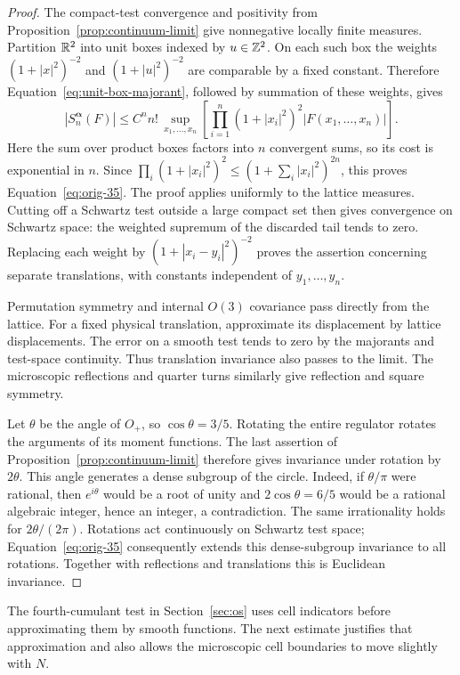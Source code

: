 \begin{proof}
The compact-test convergence and positivity from
Proposition~\ref{prop:continuum-limit} give nonnegative locally finite
measures.  Partition $\mathbb R^2$ into unit boxes indexed by $u\in\mathbb Z^2$.
On each such box the weights $(1+|x|^2)^{-2}$ and
$(1+|u|^2)^{-2}$ are comparable by a fixed constant.  Therefore
Equation~\eqref{eq:unit-box-majorant}, followed by summation of these
weights, gives
\[
 |S_n^{\boldsymbol\alpha}(F)|
  \le C^n n!\,
       \sup_{x_1,\ldots,x_n}
          \left[\prod_{i=1}^n(1+|x_i|^2)^2
                          |F(x_1,\ldots,x_n)|\right].
\]
Here the sum over product boxes factors into $n$ convergent sums, so
its cost is exponential in $n$.  Since
$\prod_i(1+|x_i|^2)^2\le(1+\sum_i|x_i|^2)^{2n}$, this proves
Equation~\eqref{eq:orig-35}.  The proof applies uniformly to the lattice
measures.  Cutting off a Schwartz test outside a large compact set
then gives convergence on Schwartz space: the weighted supremum of
the discarded tail tends to zero.  Replacing each weight by
$(1+|x_i-y_i|^2)^{-2}$ proves the assertion concerning separate
translations, with constants independent of $y_1,\ldots,y_n$.

Permutation symmetry and internal $O(3)$ covariance pass directly
from the lattice.  For a fixed physical translation, approximate its
displacement by lattice displacements.  The error on a smooth test
tends to zero by the majorants and test-space continuity.  Thus
translation invariance also passes to the limit.  The microscopic
reflections and quarter turns similarly give reflection and square
symmetry.

Let $\theta$ be the angle of $O_+$, so
$\cos\theta=3/5$.  Rotating the entire regulator rotates the arguments
of its moment functions.  The last assertion of
Proposition~\ref{prop:continuum-limit} therefore gives invariance under
rotation by $2\theta$.  This angle generates a dense subgroup of the
circle.  Indeed, if $\theta/\pi$ were rational, then
$e^{i\theta}$ would be a root of unity and
$2\cos\theta=6/5$ would be a rational algebraic integer, hence an
integer, a contradiction.  The same irrationality holds for
$2\theta/(2\pi)$.  Rotations act continuously on Schwartz test space;
Equation~\eqref{eq:orig-35} consequently extends this dense-subgroup
invariance to all rotations.  Together with reflections and
translations this is Euclidean invariance.
\end{proof}

The fourth-cumulant test in Section~\ref{sec:os} uses cell indicators before
approximating them by smooth functions.  The next estimate justifies
that approximation and also allows the microscopic cell boundaries to
move slightly with $N$.

